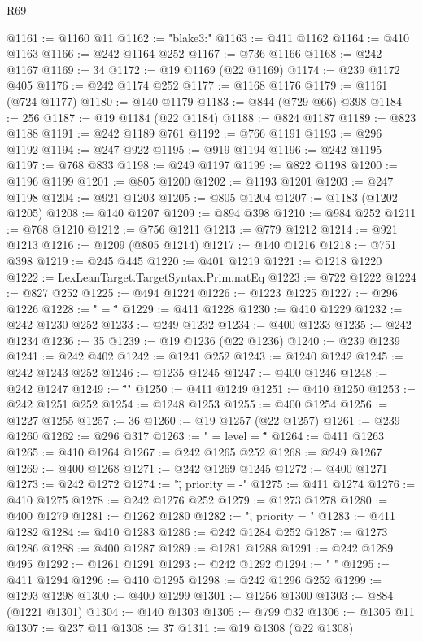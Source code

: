 \begin{lexlean}{R69}
\begin{coremodule}
@1161 := @1160 @11
@1162 := "blake3:"
@1163 := @411 @1162
@1164 := @410 @1163
@1166 := @242 @1164 @252
@1167 := @736 @1166
@1168 := @242 @1167
@1169 := 34
@1172 := @19 @1169 (@22 @1169)
@1174 := @239 @1172 @405
@1176 := @242 @1174 @252
@1177 := @1168 @1176
@1179 := @1161 (@724 @1177)
@1180 := @140 @1179
@1183 := @844 (@729 @66) @398
@1184 := 256
@1187 := @19 @1184 (@22 @1184)
@1188 := @824 @1187
@1189 := @823 @1188
@1191 := @242 @1189 @761
@1192 := @766 @1191
@1193 := @296 @1192
@1194 := @247 @922
@1195 := @919 @1194
@1196 := @242 @1195
@1197 := @768 @833
@1198 := @249 @1197
@1199 := @822 @1198
@1200 := @1196 @1199
@1201 := @805 @1200
@1202 := @1193 @1201
@1203 := @247 @1198
@1204 := @921 @1203
@1205 := @805 @1204
@1207 := @1183 (@1202 @1205)
@1208 := @140 @1207
@1209 := @894 @398
@1210 := @984 @252
@1211 := @768 @1210
@1212 := @756 @1211
@1213 := @779 @1212
@1214 := @921 @1213
@1216 := @1209 (@805 @1214)
@1217 := @140 @1216
@1218 := @751 @398
@1219 := @245 @445
@1220 := @401 @1219
@1221 := @1218 @1220
@1222 := LexLeanTarget.TargetSyntax.Prim.natEq
@1223 := @722 @1222
@1224 := @827 @252
@1225 := @494 @1224
@1226 := @1223 @1225
@1227 := @296 @1226
@1228 := " = \""
@1229 := @411 @1228
@1230 := @410 @1229
@1232 := @242 @1230 @252
@1233 := @249 @1232
@1234 := @400 @1233
@1235 := @242 @1234
@1236 := 35
@1239 := @19 @1236 (@22 @1236)
@1240 := @239 @1239
@1241 := @242 @402
@1242 := @1241 @252
@1243 := @1240 @1242
@1245 := @242 @1243 @252
@1246 := @1235 @1245
@1247 := @400 @1246
@1248 := @242 @1247
@1249 := "\"\n"
@1250 := @411 @1249
@1251 := @410 @1250
@1253 := @242 @1251 @252
@1254 := @1248 @1253
@1255 := @400 @1254
@1256 := @1227 @1255
@1257 := 36
@1260 := @19 @1257 (@22 @1257)
@1261 := @239 @1260
@1262 := @296 @317
@1263 := " = { level = \""
@1264 := @411 @1263
@1265 := @410 @1264
@1267 := @242 @1265 @252
@1268 := @249 @1267
@1269 := @400 @1268
@1271 := @242 @1269 @1245
@1272 := @400 @1271
@1273 := @242 @1272
@1274 := "\", priority = -"
@1275 := @411 @1274
@1276 := @410 @1275
@1278 := @242 @1276 @252
@1279 := @1273 @1278
@1280 := @400 @1279
@1281 := @1262 @1280
@1282 := "\", priority = "
@1283 := @411 @1282
@1284 := @410 @1283
@1286 := @242 @1284 @252
@1287 := @1273 @1286
@1288 := @400 @1287
@1289 := @1281 @1288
@1291 := @242 @1289 @495
@1292 := @1261 @1291
@1293 := @242 @1292
@1294 := " }\n"
@1295 := @411 @1294
@1296 := @410 @1295
@1298 := @242 @1296 @252
@1299 := @1293 @1298
@1300 := @400 @1299
@1301 := @1256 @1300
@1303 := @884 (@1221 @1301)
@1304 := @140 @1303
@1305 := @799 @32
@1306 := @1305 @11
@1307 := @237 @11
@1308 := 37
@1311 := @19 @1308 (@22 @1308)

\end{coremodule}
\end{lexlean}
